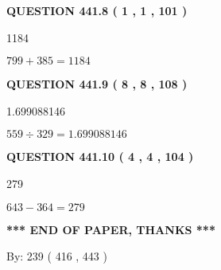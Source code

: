 \documentclass{ctexart}
\begin{document}
{\textbf{\Large{QUESTION
441.8 
 ( 1 , 1 , 101 )
}}}
  
  
 
 
\noindent{}

1184
 
 
 
 
\noindent{}

$ %
799 +  %
385=   %
1184$
 
 
  
\vspace{0.2in}
  
{\textbf{\Large{QUESTION
441.9 
 ( 8 , 8 , 108 )
}}}
  
  
 
 
\noindent{}

1.699088146
 
 
 
 
\noindent{}

$ %
559 \div  %
329=   %
1.699088146$
 
 
  
\vspace{0.2in}
  
{\textbf{\Large{QUESTION
441.10 
 ( 4 , 4 , 104 )
}}}
  
  
 
 
\noindent{}

279
 
 
 
 
\noindent{}

$ %
643 -  %
364=   %
279$
 
 
   
   
 \vspace{0.2in}
 
   
   
   
   
\vspace{1.0in} 
{\textbf{\large{ *** END OF PAPER, THANKS *** }}} 
   
   
\hspace{1.0in} By: 
 239 ( 416 ,  443 )
   
   
   
   
\newpage 
\setcounter{page}{ 
   442001 } 
   
\end{document}
